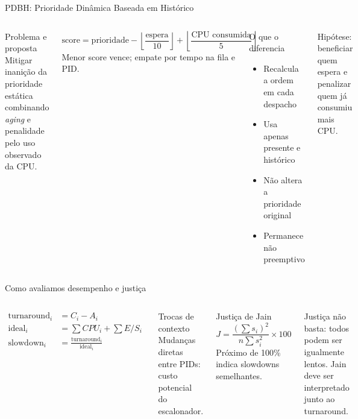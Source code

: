 \documentclass[aspectratio=169,11pt]{beamer}
\begin{document}
\begin{frame}{PDBH: Prioridade Dinâmica Baseada em Histórico}
  \begin{columns}[T,onlytextwidth]
      \begin{block}{Problema e proposta}
        Mitigar inanição da prioridade estática combinando \textit{aging} e penalidade pelo uso observado da CPU.
      \end{block}
      \[
        \text{score}=\text{prioridade}
        -\left\lfloor\frac{\text{espera}}{10}\right\rfloor
        +\left\lfloor\frac{\text{CPU consumida}}{5}\right\rfloor
      \]
      Menor score vence; empate por tempo na fila e PID.
      \begin{block}{O que o diferencia}
        \begin{itemize}
          \item Recalcula a ordem em cada despacho
          \item Usa apenas presente e histórico
          \item Não altera a prioridade original
          \item Permanece não preemptivo
        \end{itemize}
      \end{block}
      \alert{Hipótese:} beneficiar quem espera e penalizar quem já consumiu mais CPU.
  \end{columns}
\end{frame}

\begin{frame}{Como avaliamos desempenho e justiça}
  \begin{columns}[T,onlytextwidth]
      \begin{align*}
        \text{turnaround}_i &= C_i-A_i \\
        \text{ideal}_i &= \sum CPU_i+\sum E/S_i \\
        \text{slowdown}_i &= \frac{\text{turnaround}_i}{\text{ideal}_i}
      \end{align*}
      \begin{block}{Trocas de contexto}
        Mudanças diretas entre PIDs: custo potencial do escalonador.
      \end{block}
      \begin{block}{Justiça de Jain}
        \[
          J=\frac{(\sum s_i)^2}{n\sum s_i^2}\times100
        \]
        Próximo de 100\% indica slowdowns semelhantes.
      \end{block}
      \alert{Justiça não basta:} todos podem ser igualmente lentos. Jain deve ser interpretado junto ao turnaround.
  \end{columns}
\end{frame}
\end{document}
